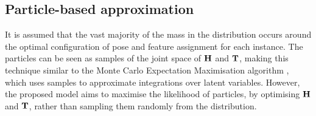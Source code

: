 \subsection{Particle-based approximation}

It is assumed that the vast majority of the mass in the distribution occurs around the optimal configuration of pose and feature assignment for each instance. The particles can be seen as samples of the joint space of $\mathbf{H}$ and $\mathbf{T}$, making this technique similar to the Monte Carlo Expectation Maximisation algorithm \cite{Levine2001, Wei1990}, which uses samples to approximate integrations over latent variables. However, the proposed model aims to maximise the likelihood of particles, by optimising $\mathbf{H}$ and $\mathbf{T}$, rather than sampling them randomly from the distribution. 

